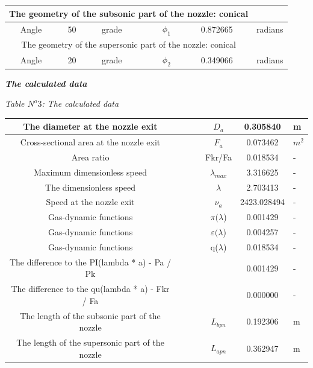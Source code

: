 \begin{center}
\begin{tabular}{  | c | c | c | c | c | c | c | }
\hline
\multicolumn{6}{|c}{The geometry of the subsonic part of the nozzle: conical} & \\
\hline
Angle & 50 & grade &  & $\phi_1$ & 0.872665 & radians \\
\hline
\multicolumn{6}{|c}{The geometry of the supersonic part of the nozzle: conical} & \\
\hline
Angle & 20 & grade &  & $\phi_2$ & 0.349066 & radians \\
\hline
\end{tabular}
\begin{center}
\textbf{\textit{The calculated data}}\\
\end{center}
\begin{flushright}
\textit{Table $N^o 3$: The calculated data}\\
\end{flushright}
\begin{tabular}{  | c | p{1.5cm} | p{1.5cm} | p{1.5cm} | c | c | p{1.5cm} | }
\hline
The diameter at the nozzle exit &  &  &  & $D_a$ & 0.305840 & m \\
\hline
Cross-sectional area at the nozzle exit &  &  &  & $F_a$ & 0.073462 & $m^2$ \\
\hline
Area ratio &  &  &  & Fkr/Fa & 0.018534 & - \\
\hline
Maximum dimensionless speed &  &  &  & $\lambda_{max}$ & 3.316625 & - \\
\hline
The dimensionless speed &  &  &  & $\lambda$ & 2.703413 & - \\
\hline
Speed at the nozzle exit &  &  &  & $\nu_a$ & 2423.028494 & - \\
\hline
Gas-dynamic functions &  &  &  & $\pi(\lambda$) & 0.001429 & - \\
\hline
Gas-dynamic functions &  &  &  & $\varepsilon(\lambda$) & 0.004257 & - \\
\hline
Gas-dynamic functions &  &  &  & q($\lambda$) & 0.018534 & - \\
\hline
The difference to the PI(lambda * a) - Pa / Pk &  &  &  &  & 0.001429 & - \\
\hline
The difference to the qu(lambda * a) - Fkr / Fa &  &  &  &  & 0.000000 & - \\
\hline
The length of the subsonic part of the nozzle &  &  &  & $L_{bpn}$ & 0.192306 & m \\
\hline
The length of the supersonic part of the nozzle &  &  &  & $L_{apn}$ & 0.362947 & m  \\
\hline
\end{tabular}
\end{center}
